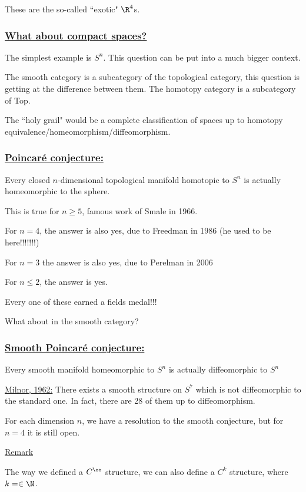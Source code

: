 \documentclass[x11names,reqno,14pt]{extarticle}
\begin{document}
These are the so-called ``exotic" $\R^4$s.

\subsubsection*{\underline{What about compact spaces?}}

The simplest example is $S^n$. This question can be put into a much bigger context. 

The smooth category is a subcategory of the topological category, this question is getting at the difference between them. The homotopy category is a subcategory of Top. 

The ``holy grail" would be a complete classification of spaces up to homotopy equivalence/homeomorphism/diffeomorphism. 

\subsubsection*{\underline{Poincar\'e conjecture:}} Every closed $n$-dimensional topological manifold homotopic to $S^n$ is actually homeomorphic to the sphere. 

This is true for $n \geq 5$, famous work of Smale in 1966. 

For $n = 4$, the answer is also yes, due to Freedman in 1986 (he used to be here!!!!!!!)

For $n = 3$ the answer is also yes, due to Perelman in 2006

For $n \leq 2$, the answer is yes. 

Every one of these earned a fields medal!!!

What about in the smooth category?

\subsubsection*{\underline{Smooth Poincar\'e conjecture:}} Every smooth manifold homeomorphic to $S^n$ is actually diffeomorphic to $S^n$

\underline{Milnor, 1962:} There exists a smooth structure on $S^7$ which is not diffeomorphic to the standard one. In fact, there are 28 of them up to diffeomorphism. 

For each dimension $n$, we have a resolution to the smooth conjecture, but for $n = 4$ it is still open. 

\underline{Remark}

The way we defined a $C^\oo$ structure, we can also define a $C^k$ structure, where $k = \in \N$. 
\end{document}
